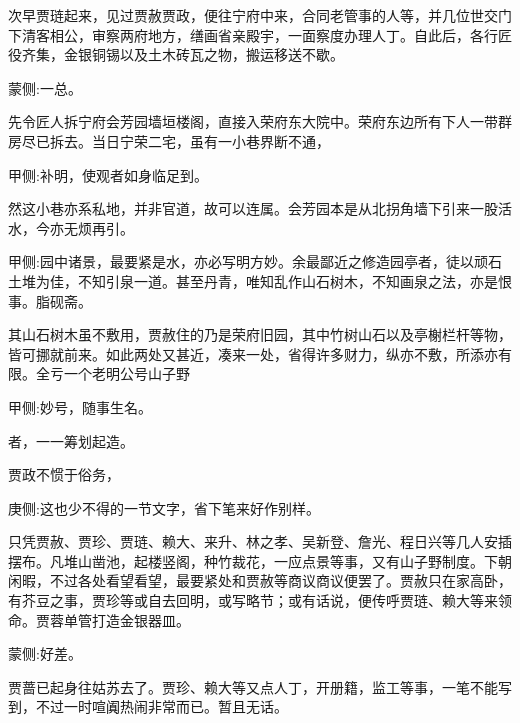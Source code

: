 \begin{parag}
    次早贾琏起来，见过贾赦贾政，便往宁府中来，合同老管事的人等，并几位世交门下清客相公，审察两府地方，缮画省亲殿宇，一面察度办理人丁。自此后，各行匠役齐集，金银铜锡以及土木砖瓦之物，搬运移送不歇。\begin{note}蒙侧:一总。\end{note}先令匠人拆宁府会芳园墙垣楼阁，直接入荣府东大院中。荣府东边所有下人一带群房尽已拆去。当日宁荣二宅，虽有一小巷界断不通，\begin{note}甲侧:补明，使观者如身临足到。\end{note}然这小巷亦系私地，并非官道，故可以连属。会芳园本是从北拐角墙下引来一股活水，今亦无烦再引。\begin{note}甲侧:园中诸景，最要紧是水，亦必写明方妙。余最鄙近之修造园亭者，徒以顽石土堆为佳，不知引泉一道。甚至丹青，唯知乱作山石树木，不知画泉之法，亦是恨事。脂砚斋。\end{note}其山石树木虽不敷用，贾赦住的乃是荣府旧园，其中竹树山石以及亭榭栏杆等物，皆可挪就前来。如此两处又甚近，凑来一处，省得许多财力，纵亦不敷，所添亦有限。全亏一个老明公号山子野\begin{note}甲侧:妙号，随事生名。\end{note}者，一一筹划起造。
\end{parag}


\begin{parag}
    贾政不惯于俗务，\begin{note}庚侧:这也少不得的一节文字，省下笔来好作别样。\end{note}只凭贾赦、贾珍、贾琏、赖大、来升、林之孝、吴新登、詹光、程日兴等几人安插摆布。凡堆山凿池，起楼竖阁，种竹裁花，一应点景等事，又有山子野制度。下朝闲暇，不过各处看望看望，最要紧处和贾赦等商议商议便罢了。贾赦只在家高卧，有芥豆之事，贾珍等或自去回明，或写略节；或有话说，便传呼贾琏、赖大等来领命。贾蓉单管打造金银器皿。\begin{note}蒙侧:好差。\end{note}贾蔷已起身往姑苏去了。贾珍、赖大等又点人丁，开册籍，监工等事，一笔不能写到，不过一时喧阗热闹非常而已。暂且无话。
\end{parag}


